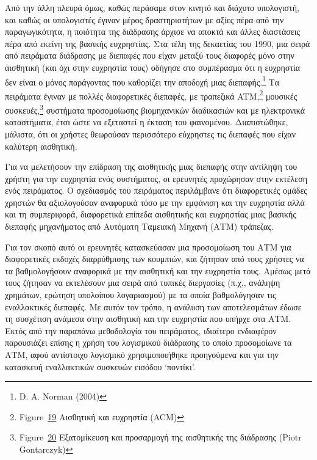 \documentclass[
]{article}
\begin{document}
Από την άλλη πλευρά όμως, καθώς περάσαμε στον κινητό και διάχυτο
υπολογιστή, και καθώς οι υπολογιστές έγιναν μέρος δραστηριοτήτων με
αξίες πέρα από την παραγωγικότητα, η ποιότητα της διάδρασης άρχισε να
αποκτά και άλλες διαστάσεις πέρα από εκείνη της βασικής ευχρηστίας. Στα
τέλη της δεκαετίας του 1990, μια σειρά από πειράματα διάδρασης με
διεπαφές που είχαν μεταξύ τους διαφορές μόνο στην αισθητική (και όχι
στην ευχρηστία τους) οδήγησε στο συμπέρασμα ότι η ευχρηστία δεν είναι ο
μόνος παράγοντας που καθορίζει την αποδοχή μιας διεπαφής.\footnote{D. A.
  Norman (2004)} Τα πειράματα έγιναν με πολλές διαφορετικές διεπαφές, με
τραπεζικά ATM,\footnote{Figure~\protect\hyperlink{fig:atm-affective}{19}
  Αισθητική και ευχρηστία (ACM)} μουσικές συσκευές,\footnote{Figure~\protect\hyperlink{fig:winamp}{20}
  Εξατομίκευση και προσαρμογή της αισθητικής της διάδρασης (Piotr
  Gontarczyk)} συστήματα προσομοίωσης βιομηχανικών διαδικασιών και με
ηλεκτρονικά καταστήματα, έτσι ώστε να εξεταστεί η έκταση του φαινομένου.
Διαπιστώθηκε, μάλιστα, ότι οι χρήστες θεωρούσαν περισσότερο εύχρηστες
τις διεπαφές που είχαν καλύτερη αισθητική.

Για να μελετήσουν την επίδραση της αισθητικής μιας διεπαφής στην
αντίληψη του χρήστη για την ευχρηστία ενός συστήματος, οι ερευνητές
προχώρησαν στην εκτέλεση ενός πειράματος. Ο σχεδιασμός του πειράματος
περιλάμβανε ότι διαφορετικές ομάδες χρηστών θα αξιολογούσαν αναφορικά
τόσο με την εμφάνιση και την ευχρηστία αλλά και τη συμπεριφορά,
διαφορετικά επίπεδα αισθητικής και ευχρηστίας μιας βασικής διεπαφής
μηχανήματος από Αυτόματη Ταμειακή Μηχανή (ΑΤΜ) τράπεζας.

Για τον σκοπό αυτό οι ερευνητές κατασκεύασαν μια προσομοίωση του ΑΤΜ για
διαφορετικές εκδοχές διαρρύθμισης των κουμπιών, και ζήτησαν από τους
χρήστες να τα βαθμολογήσουν αναφορικά με την αισθητική και την ευχρηστία
τους. Αμέσως μετά τους ζήτησαν να εκτελέσουν μια σειρά από τυπικές
διεργασίες (π.χ., ανάληψη χρημάτων, ερώτηση υπολοίπου λογαριασμού) με τα
οποία βαθμολόγησαν τις εναλλακτικές διεπαφές. Με αυτόν τον τρόπο, η
ανάλυση των αποτελεσμάτων έδωσε τη συσχέτιση ανάμεσα στην αισθητική και
την ευχρηστία που υπήρχε στα ΑΤΜ. Εκτός από την παραπάνω μεθοδολογία του
πειράματος, ιδιαίτερο ενδιαφέρον παρουσιάζει επίσης η χρήση του
λογισμικού διάδρασης το οποίο προσομοίωνε τα ΑΤΜ, αφού αντίστοιχο
λογισμικό χρησιμοποιήθηκε προηγούμενα και για την κατασκευή εναλλακτικών
συσκευών εισόδου `ποντίκι'.
\end{document}
